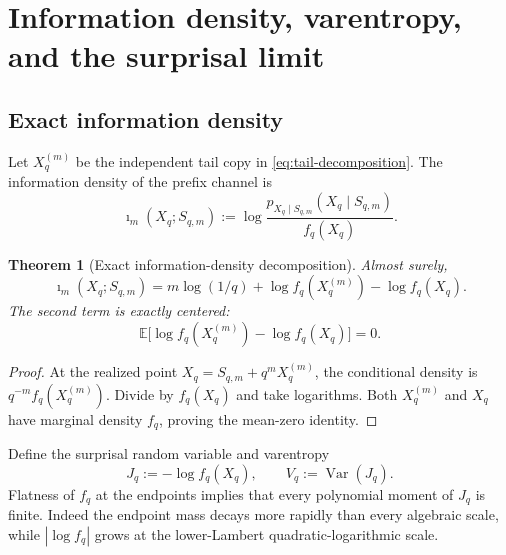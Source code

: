 \documentclass[11pt,oneside]{article}
\newtheorem{theorem}{Theorem}[section]
\theoremstyle{definition}
\theoremstyle{remark}
\newcommand{\E}{\mathbb E}
\newcommand{\Var}{\operatorname{Var}}
\begin{document}
\section{Information density, varentropy, and the surprisal limit}
\label{sec:information-spectrum}

\subsection{Exact information density}

Let $X_q^{(m)}$ be the independent tail copy in
\eqref{eq:tail-decomposition}.  The information density of the prefix channel is
\begin{equation}
 \imath_m(X_q;S_{q,m})
 :=\log\frac{p_{X_q\mid S_{q,m}}(X_q\mid S_{q,m})}{f_q(X_q)}.
 \label{eq:info-density-def}
\end{equation}

\begin{theorem}[Exact information-density decomposition]
\label{thm:info-density}
Almost surely,
\begin{equation}
 \boxed{
 \imath_m(X_q;S_{q,m})
 =m\log(1/q)+\log f_q(X_q^{(m)})-\log f_q(X_q).}
 \label{eq:info-density}
\end{equation}
The second term is exactly centered:
\begin{equation}
 \E\bigl[\log f_q(X_q^{(m)})-\log f_q(X_q)\bigr]=0.
 \label{eq:centered-exact}
\end{equation}
\end{theorem}

\begin{proof}
At the realized point $X_q=S_{q,m}+q^mX_q^{(m)}$, the conditional density is
$q^{-m}f_q(X_q^{(m)})$.  Divide by $f_q(X_q)$ and take logarithms.  Both
$X_q^{(m)}$ and $X_q$ have marginal density $f_q$, proving the mean-zero identity.
\end{proof}

Define the surprisal random variable and varentropy
\begin{equation}
 J_q:=-\log f_q(X_q),
 \qquad V_q:=\Var(J_q).
 \label{eq:surprisal}
\end{equation}
Flatness of $f_q$ at the endpoints implies that every polynomial moment of $J_q$
is finite.  Indeed the endpoint mass decays more rapidly than every algebraic
scale, while $|\log f_q|$ grows at the lower-Lambert quadratic-logarithmic scale.
\end{document}
